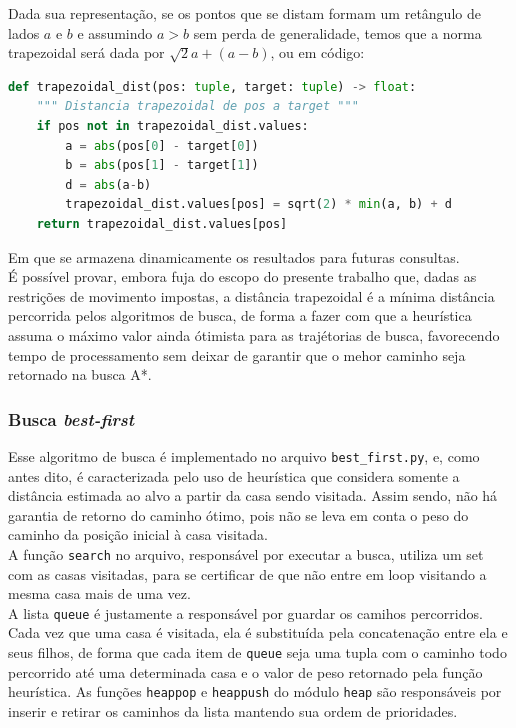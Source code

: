 \documentclass[12pt]{article}
\begin{document}
Dada sua representação, se os pontos que se distam formam um retângulo de lados \(a\) e \(b\) e assumindo \(a > b\) sem perda de generalidade, temos que a norma trapezoidal será dada por \(\sqrt{2}a + (a - b)\), ou em código:\\

\begin{lstlisting}[language=Python]
def trapezoidal_dist(pos: tuple, target: tuple) -> float:
    """ Distancia trapezoidal de pos a target """
    if pos not in trapezoidal_dist.values:
        a = abs(pos[0] - target[0])
        b = abs(pos[1] - target[1])
        d = abs(a-b)
        trapezoidal_dist.values[pos] = sqrt(2) * min(a, b) + d
    return trapezoidal_dist.values[pos]
\end{lstlisting}

Em que se armazena dinamicamente os resultados para futuras consultas.\\

É possível provar, embora fuja do escopo do presente trabalho que, dadas as restrições de movimento impostas, a distância trapezoidal é a mínima distância percorrida pelos algoritmos de busca, de forma a fazer com que a heurística assuma o máximo valor ainda ótimista para as trajétorias de busca, favorecendo tempo de processamento sem deixar de garantir que o mehor caminho seja retornado na busca A*.

\subsubsection{Busca \emph{best-first}}

Esse algoritmo de busca é implementado no arquivo \verb|best_first.py|, e, como antes dito, é caracterizada pelo uso de heurística que considera somente a distância estimada ao alvo a partir da casa sendo visitada. Assim sendo, não há garantia de retorno do caminho ótimo, pois não se leva em conta o peso do caminho da posição inicial à casa visitada.\\

A função \verb|search| no arquivo, responsável por executar a busca, utiliza um set com as casas visitadas, para se certificar de que não entre em loop visitando a mesma casa mais de uma vez.\\

A lista \verb|queue| é justamente a responsável por guardar os camihos percorridos. Cada vez que uma casa é visitada, ela é substituída pela concatenação entre ela e seus filhos, de forma que cada item de \verb|queue| seja uma tupla com o caminho todo percorrido até uma determinada casa e o valor de peso retornado pela função heurística. As funções \verb|heappop| e \verb|heappush| do módulo \verb|heap| são responsáveis por inserir e retirar os caminhos da lista mantendo sua ordem de prioridades.\\
\end{document}
